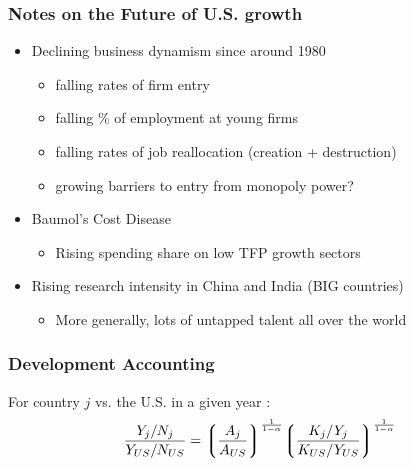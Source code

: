 \documentclass[serif,professionalfont,red,aspectratio=169]{beamer}
\begin{document}
\begin{frame}[t]
\frametitle{Notes on the Future of U.S. growth}
\vspace{2mm}
\begin{itemize}
\item Declining business dynamism since around 1980
\vspace{2mm}
\begin{itemize}
\item falling rates of firm entry
\vspace{2mm}
\item falling \% of employment at young firms
\vspace{2mm}
\item falling rates of job reallocation (creation + destruction)
\vspace{2mm}
\item growing barriers to entry from monopoly power?
\end{itemize}
\vspace{4mm}
\item Baumol's Cost Disease
\begin{itemize}
\vspace{2mm}
\item Rising spending share on low TFP growth sectors
\end{itemize}
\vspace{4mm}
\item Rising research intensity in China and India (BIG countries)
\begin{itemize}
\vspace{2mm}
\item More generally, lots of untapped talent all over the world
\end{itemize}
\end{itemize}
\end{frame}
\begin{frame}[t]
\frametitle{Development Accounting}
\vspace{4mm}
For country $j$  vs. the U.S. in a given year : 
\vspace{2mm}
\begin{align*}
    \dfrac{Y_j/N_j}{Y_{US}/N_{US}}=\bigg\lgroup \dfrac{A_j}{A_{US}}\bigg\rgroup^{\frac{1}{1-\alpha}}%
    \bigg\lgroup \dfrac{K_j/Y_j}{K_{US}/Y_{US}}\bigg\rgroup^{\frac{1}{1-\alpha}}
\end{align*}
\end{frame}
\end{document}
